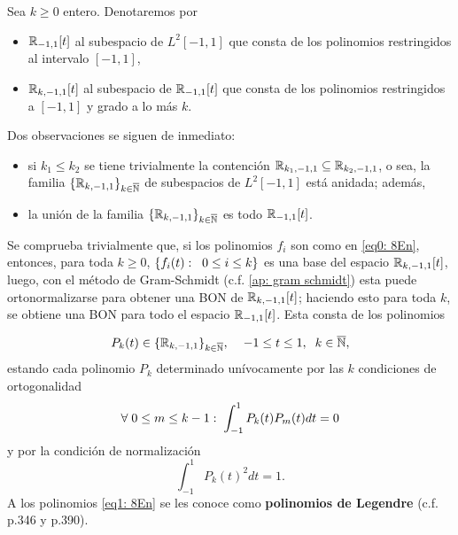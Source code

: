 \begin{notacion}
\label{notacion: 17ap}
Sea $k \geq 0$ entero.
Denotaremos por 
\begin{itemize}
	\item $\mathbb{R}_{-1,1}[t]$ al subespacio de $L^{2}[-1,1]$ que consta de los
	polinomios restringidos al intervalo $[-1,1]$,
	
	\item $\mathbb{R}_{k,-1,1}[t]$ al subespacio de $\mathbb{R}_{-1,1}[t]$
	que consta de los polinomios restringidos a $[-1,1]$ y grado a lo
	más $k$.
\end{itemize}
\end{notacion}


Dos observaciones se siguen de inmediato:
\begin{itemize}
	\item si $k_{1} \leq k_{2}$ se tiene trivialmente la contención
$\mathbb{R}_{k_{1}, -1,1} \subseteq \mathbb{R}_{k_{2}, -1,1}$, o sea, la familia
$\{\mathbb{R}_{k, -1,1}\}_{k \in \overline{\mathbb{N}}}$ de subespacios
de $L^{2}[-1,1]$ está anidada; además, 

	\item la unión de la familia $\{\mathbb{R}_{k, -1,1}\}_{k \in \overline{\mathbb{N}}}$
	es todo $\mathbb{R}_{-1,1}[t]$.
\end{itemize}


Se comprueba trivialmente que, si los polinomios
$f_{i}$ son como en \eqref{eq0: 8En}, entonces,
para toda $k \geq 0$, $\{f_{i}(t): \hspace{0.2cm} 0 \leq i \leq k \}$
es una base del espacio $\mathbb{R}_{k,-1,1}[t]$, luego, con el 
método de Gram-Schmidt
(c.f. \ref{ap: gram schmidt}) esta puede ortonormalizarse para
obtener una BON de $\mathbb{R}_{k,-1,1}[t]$; haciendo esto
para toda $k$, se obtiene una BON 
para todo el espacio $\mathbb{R}_{-1,1}[t]$. Esta consta de los polinomios


\begin{equation}
\label{eq1: 8En}
P_{k}(t)\in \{\mathbb{R}_{k, -1,1}\}_{k \in \overline{\mathbb{N}}}, \hspace{0.4cm}
-1 \leq t \leq 1, \hspace{0.2cm}
 k \in \overline{\mathbb{N}},
\end{equation}
estando cada polinomio $P_{k}$ determinado unívocamente
por las $k$ condiciones de ortogonalidad
\[
\forall \hspace{0.1cm} 0 \leq m \leq k-1: \hspace{0.1cm}
\int_{-1}^{1}{P_{k}(t)P_{m}(t)} dt = 0
\]
y por la condición de normalización 
\[
\int_{-1}^{1}{P_{k}(t)^{2}} dt = 1.
\]
A los polinomios \eqref{eq1: 8En}
se les conoce como \textbf{polinomios de Legendre}
 (c.f. \cite{friedberg} p.346
y \cite{DSML} p.390).

